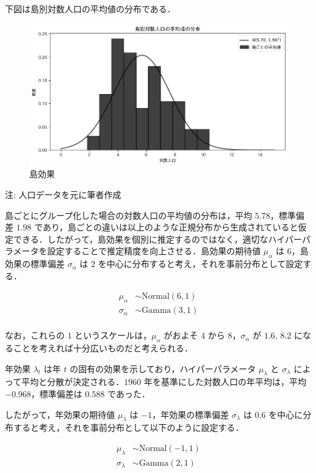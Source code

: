 下図は島別対数人口の平均値の分布である．

\begin{figure}
\centering
\includegraphics{../figures/define_models/mean_by_island.png}
\caption{島効果}
\end{figure}

注: 人口データを元に筆者作成

島ごとにグループ化した場合の対数人口の平均値の分布は，平均
\(5.78\)，標準偏差 \(1.98\)
であり，島ごとの違いは以上のような正規分布から生成されていると仮定できる．したがって，島効果を個別に推定するのではなく，適切なハイパーパラメータを設定することで推定精度を向上させる．島効果の期待値
\(\mu_{\alpha}\) は \(6\)，島効果の標準偏差 \(\sigma_{\alpha}\) は \(2\)
を中心に分布すると考え，それを事前分布として設定する．

\[
\begin{aligned}
\mu_{\alpha} &\sim \text{Normal}(6, 1) \\
\sigma_{\alpha} &\sim \text{Gamma}(3, 1) \\
\end{aligned}
\]

なお，これらの \(1\) というスケールは，\(\mu_{\alpha}\) がおよそ \(4\)
から \(8\)，\(\sigma_{\alpha}\) が \(1.6\), \(8.2\)
になることを考えれば十分広いものだと考えられる．

年効果 \(\lambda_t\) は年 \(t\)
の固有の効果を示しており，ハイパーパラメータ \(\mu_{\lambda}\) と
\(\sigma_{\lambda}\) によって平均と分散が決定される．\(1960\)
年を基準にした対数人口の年平均は，平均 \(-0.968\)，標準偏差は \(0.588\)
であった．

したがって，年効果の期待値 \(\mu_{\lambda}\) は \(-1\)，年効果の標準偏差
\(\sigma_{\lambda}\) は \(0.6\)
を中心に分布すると考え，それを事前分布として以下のように設定する．

\[
\begin{aligned}
\mu_{\lambda} &\sim \text{Normal}(-1, 1) \\
\sigma_{\lambda} &\sim \text{Gamma}(2, 1) \\
\end{aligned}
\]

